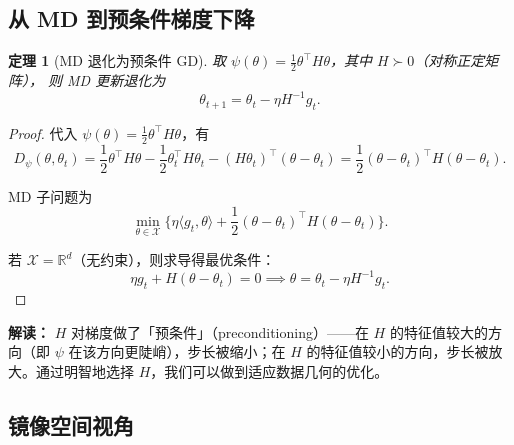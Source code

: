 \documentclass[12pt,a4paper]{ctexart}
\theoremstyle{definition}
\theoremstyle{plain}
\newtheorem{theorem}{定理}[section]
\theoremstyle{remark}
\newcommand{\R}{\mathbb{R}}
\newcommand{\cX}{\mathcal{X}}
\begin{document}
\subsection{从 MD 到预条件梯度下降}

\begin{theorem}[MD 退化为预条件 GD]\label{thm:md-to-gd}
取 $\psi(\theta) = \frac{1}{2}\theta^\top H \theta$，其中 $H \succ 0$（对称正定矩阵），
则 MD 更新退化为
\begin{equation}\label{eq:precond-gd}
  \theta_{t+1} = \theta_t - \eta H^{-1} g_t.
\end{equation}
\end{theorem}

\begin{proof}
代入 $\psi(\theta) = \frac{1}{2}\theta^\top H \theta$，有
\[
  D_\psi(\theta, \theta_t)
  = \frac{1}{2}\theta^\top H \theta
    - \frac{1}{2}\theta_t^\top H \theta_t
    - (H\theta_t)^\top (\theta - \theta_t)
  = \frac{1}{2}(\theta - \theta_t)^\top H (\theta - \theta_t).
\]

MD 子问题为
\[
  \min_{\theta \in \cX}
  \Big\{ \eta \langle g_t, \theta \rangle + \frac{1}{2}(\theta - \theta_t)^\top H (\theta - \theta_t) \Big\}.
\]

若 $\cX = \R^d$（无约束），则求导得最优条件：
\[
  \eta g_t + H(\theta - \theta_t) = 0
  \implies \theta = \theta_t - \eta H^{-1} g_t.
\]
\end{proof}

\textbf{解读：} $H$ 对梯度做了「预条件」（preconditioning）——在 $H$ 的特征值较大的方向（即 $\psi$ 在该方向更陡峭），步长被缩小；在 $H$ 的特征值较小的方向，步长被放大。通过明智地选择 $H$，我们可以做到适应数据几何的优化。

\subsection{镜像空间视角}

\begin{figure}[htbp]
\centering
{}
\end{figure}
\end{document}
